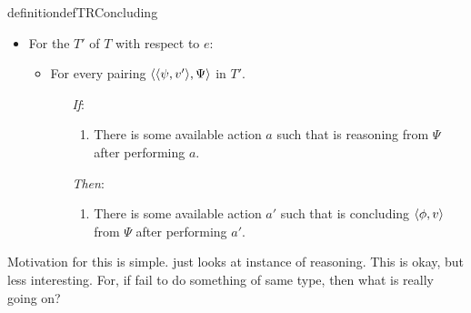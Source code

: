 \begin{note}
\begin{restatable}[\tC{2}]{definition}{defTRConcluding}
    \begin{itemize}[noitemsep]
    \item
      For the  \(T'\) of \(T\) with respect to \(e\):
      \begin{itemize}[noitemsep]
      \item
        For every pairing \(\langle \langle \psi, v' \rangle, \Psi \rangle\) in \(T'\).
        \begin{itemize}[noitemsep]
        \item[\emph{If}:]
          \begin{enumerate}[label=\alph*., ref=(\alph*), series=tRSketch]
          \item
            There is some available action \(a\) such that \vAgent{} is reasoning from \(\Psi\) after performing \(a\).
          \end{enumerate}
        \item[\emph{Then}:]
          \begin{enumerate}[label=\alph*., ref=(\alph*), resume*=tRSketch]
          \item
            There is some available action \(a'\) such that \vAgent{} is concluding \(\langle \phi, v \rangle\) from \(\Psi\) after performing \(a'\).
          \end{enumerate}
        \end{itemize}
      \end{itemize}
    \end{itemize}
    \vspace{-\baselineskip}
  \end{restatable}

  Motivation for this is simple.
  \tR{} just looks at instance of reasoning.
  This is okay, but less interesting.
  For, if fail to do something of same type, then what is really going on?
\end{note}



